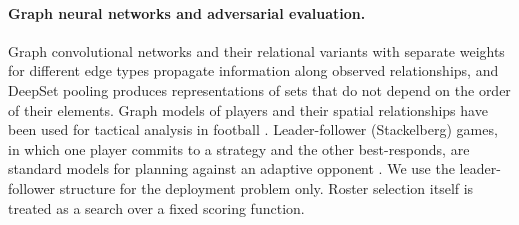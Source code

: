 \paragraph{Graph neural networks and adversarial evaluation.} Graph convolutional networks \citep{kipf2017} and their relational variants with separate weights for different edge types \citep{schlichtkrull2018} propagate information along observed relationships, and DeepSet pooling \citep{zaheer2017} produces representations of sets that do not depend on the order of their elements. Graph models of players and their spatial relationships have been used for tactical analysis in football \citep{wang2024tacticai}. Leader-follower (Stackelberg) games, in which one player commits to a strategy and the other best-responds, are standard models for planning against an adaptive opponent \citep{conitzer2006,tambe2011}. We use the leader-follower structure for the deployment problem only. Roster selection itself is treated as a search over a fixed scoring function.
